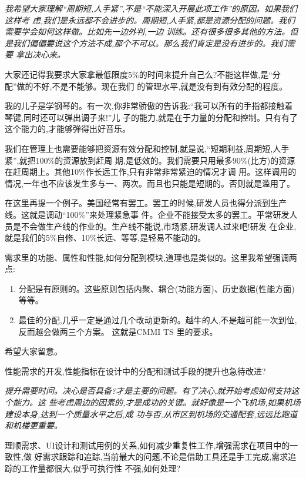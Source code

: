 \documentclass[11pt]{article}
\begin{document}
\ylogo \itshape 我希望大家理解``周期短,人手紧'',不是``不能深入开展此项工作''的原因。如果我们这样考
虑,我们是永远都不会进步的。周期短,人手紧,都是资源分配的问题。我们需要学会如何这样做。比如先一边外判,一边
训练。还有很多很多其他的方法。但是我们偏偏要说这个方法不成,那个不可以。那么我们肯定是没有进步的。我们需要
拿出决心来。

大家还记得我要求大家拿最低限度5\%的时间来提升自己么?不能这样做,是``分配''做的不好,不是不能够。现在我们
的管理水平,就是没有到有效分配的程度。

我的儿子是学钢琴的。有一次,你非常骄傲的告诉我:``我可以所有的手指都接触着琴键,同时还可以弹出调子来!''儿
子的能力,就是在于力量的分配和控制。只有有了这个能力的,才能够弹得出好音乐。

我们在管理上也需要能够把资源有效分配和控制,就是说,``短期利益,周期短,人手紧'',就把100\%的资源放到赶周
期,是低效的。我们需要只用最多90\%(比方)的资源在赶周期上。其他10\%作长远工作,只有非常非常紧迫的情况才调
用。这样调用的情况,一年也不应该发生多与一、两次。而且也只能是短期的。否则就是滥用了。

在这里再提一个例子。美国经常有罢工。罢工的时候,研发人员也得分派到生产线。这就是调动``100\%''来处理紧急事
件。企业不能接受太多的罢工。平常研发人员是不会做生产线的作业的。生产线不能说,市场紧,研发调人过来吧!研发
在企业,就是我们的5\%自修、10\%长远、等等,是轻易不能动的。

需求里的功能、属性和性能,如何分配到模块,道理也是类似的。这里我希望强调两点:
\begin{enumerate}
\item 分配是有原则的。这些原则包括内聚、耦合(功能方面)、历史数据(性能方面)等等。
\item 最佳的分配,几乎一定是通过几个改动更新的。越牛的人,不是越可能一次到位,反而越会做两三个方案。
  这就是CMMI TS 里的要求。
\end{enumerate}
希望大家留意。

\qlogo \rmfamily 性能需求的开发,性能指标在设计中的分配和测试手段的提升也急待改进?

\ylogo \itshape 提升需要时间。决心是否具备?才是主要的问题。有了决心,就开始考虑如何支持这个能力。这
  些考虑周边的因素的,才是成功的关键。就好像是一个飞机场,如果机场建设本身,达到一个质量水平之后,成
  功与否,从市区到机场的交通配套,远远比跑道和机楼更重要。

\qlogo \rmfamily 理顺需求、UI设计和测试用例的关系,如何减少重复性工作,增强需求在项目中的一致性,做
  好需求跟踪和追踪,当前最大的问题,不论是借助工具还是手工完成,需求追踪的工作量都很大,似乎可执行性
  不强,如何处理?
\end{document}
